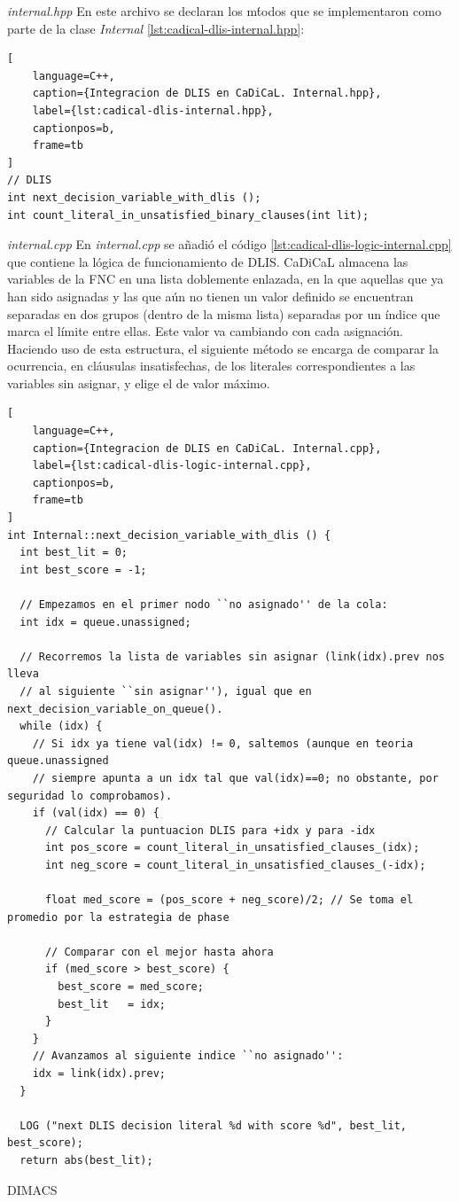 {\textit{internal.hpp}}
En este archivo se declaran los m\'todos que se implementaron como parte de la clase \textit{Internal} \ref{lst:cadical-dlis-internal.hpp}:

\begin{lstlisting}[
    language=C++,
    caption={Integracion de DLIS en CaDiCaL. Internal.hpp},
    label={lst:cadical-dlis-internal.hpp},
    captionpos=b,
    frame=tb
]
// DLIS
int next_decision_variable_with_dlis ();
int count_literal_in_unsatisfied_binary_clauses(int lit);

\end{lstlisting}

{\textit{internal.cpp}}
En \textit{internal.cpp} se a\~nadi\'o el c\'odigo \ref{lst:cadical-dlis-logic-internal.cpp} que contiene la l\'ogica de funcionamiento de DLIS.
CaDiCaL almacena las variables de la FNC en una lista doblemente enlazada, en la que aquellas que ya han sido asignadas y las que a\'un no tienen un valor definido se encuentran separadas en dos grupos (dentro de la misma lista) separadas por un \'indice que marca el l\'imite entre ellas. Este valor va cambiando con cada asignaci\'on. Haciendo uso de esta estructura, el siguiente m\'etodo se encarga de comparar la ocurrencia, en cl\'ausulas insatisfechas, de los literales correspondientes a las variables sin asignar, y elige el de valor m\'aximo.

\begin{lstlisting}[
    language=C++,
    caption={Integracion de DLIS en CaDiCaL. Internal.cpp},
    label={lst:cadical-dlis-logic-internal.cpp},
    captionpos=b,
    frame=tb
]
int Internal::next_decision_variable_with_dlis () {
  int best_lit = 0;
  int best_score = -1;

  // Empezamos en el primer nodo ``no asignado'' de la cola:
  int idx = queue.unassigned;

  // Recorremos la lista de variables sin asignar (link(idx).prev nos lleva
  // al siguiente ``sin asignar''), igual que en next_decision_variable_on_queue().
  while (idx) {
    // Si idx ya tiene val(idx) != 0, saltemos (aunque en teoria queue.unassigned
    // siempre apunta a un idx tal que val(idx)==0; no obstante, por seguridad lo comprobamos).
    if (val(idx) == 0) {
      // Calcular la puntuacion DLIS para +idx y para -idx
      int pos_score = count_literal_in_unsatisfied_clauses_(idx);
      int neg_score = count_literal_in_unsatisfied_clauses_(-idx);

      float med_score = (pos_score + neg_score)/2; // Se toma el promedio por la estrategia de phase

      // Comparar con el mejor hasta ahora
      if (med_score > best_score) {
        best_score = med_score;
        best_lit   = idx;    
      }      
    }
    // Avanzamos al siguiente indice ``no asignado'':
    idx = link(idx).prev;
  }

  LOG ("next DLIS decision literal %d with score %d", best_lit, best_score);
  return abs(best_lit);

\end{lstlisting}
DIMACS

